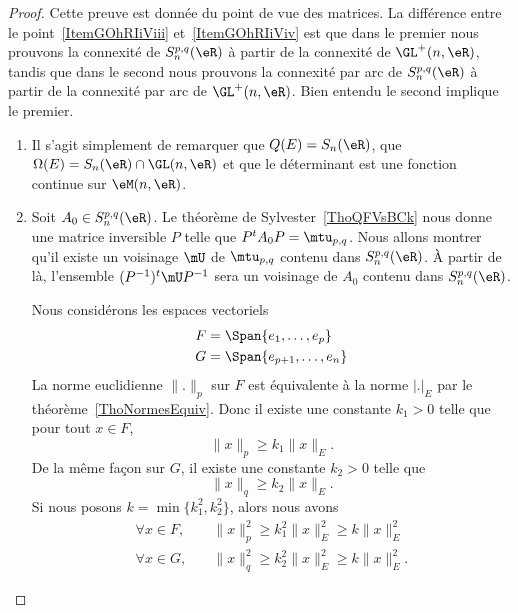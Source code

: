 \begin{proof}
    Cette preuve est donnée du point de vue des matrices. La différence entre le point~\ref{ItemGOhRIiViii} et~\ref{ItemGOhRIiViv} est que dans le premier nous prouvons la connexité de \( S_n^{p,q}(\eR)\) à partir de la connexité de \( \GL^+(n,\eR)\), tandis que dans le second nous prouvons la connexité par arc de \( S_n^{p,q}(\eR)\) à partir de la connexité par arc de \( \GL^+(n,\eR)\). Bien entendu le second implique le premier.
    \begin{enumerate}
        \item
            Il s'agit simplement de remarquer que \( Q(E)=S_n(\eR)\), que \( \Omega(E)=S_n(\eR)\cap\GL(n,\eR)\) et que le déterminant est une fonction continue sur \( \eM(n,\eR)\).
        \item
            Soit \( A_0\in S_n^{p,q}(\eR)\). Le théorème de Sylvester~\ref{ThoQFVsBCk} nous donne une matrice inversible \( P\) telle que \( P^tA_0P=\mtu_{p,q}\). Nous allons montrer qu'il existe un voisinage \( \mU\) de \( \mtu_{p,q}\) contenu dans \( S_n^{p,q}(\eR)\). À partir de là, l'ensemble \( (P^{-1})^t\mU P^{-1}\) sera un voisinage de \( A_0\) contenu dans \( S_n^{p,q}(\eR)\).

            Nous considérons les espaces vectoriels
            \begin{subequations}
                \begin{align}
                    F&=\Span\{ e_1,\ldots, e_p \}\\
                    G&=\Span\{ e_{p+1},\ldots, e_n \}
                \end{align}
            \end{subequations}
            La norme euclidienne \( \| . \|_p\) sur \( F\) est équivalente à la norme \( | . |_E\) par le théorème~\ref{ThoNormesEquiv}. Donc il existe une constante \( k_1>0\) telle que pour tout \( x\in F\),
            \begin{equation}    \label{EqMViCjJJ}
                \| x \|_p\geq k_1\| x \|_E.
            \end{equation}
            De la même façon sur \( G\), il existe une constante \( k_2>0\) telle que
            \begin{equation}    \label{EqSFwOcDw}
                \| x \|_q\geq k_2\| x \|_E.
            \end{equation}
            Si nous posons \( k=\min\{ k_1^2,k_2^2 \}\), alors nous avons
            \begin{subequations}
                \begin{align}
                    \forall x\in F,\quad &\| x \|_p^2\geq k_1^2\| x \|_E^2\geq k\| x \|_E^2\\
                    \forall x\in G,\quad &\| x \|_q^2\geq k_2^2\| x \|_E^2\geq k\| x \|_E^2.
                \end{align}
            \end{subequations}


\end{enumerate}
\end{proof}
